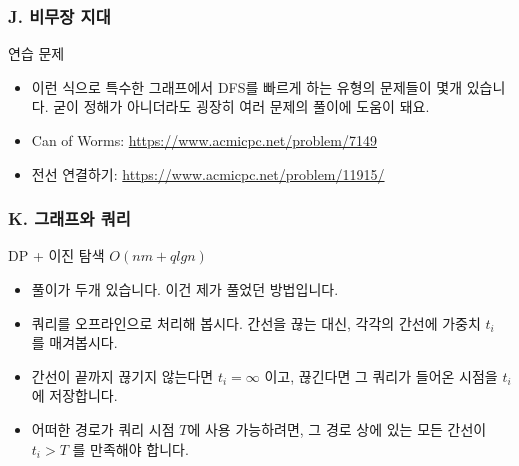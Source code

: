 \documentclass{beamer}
\begin{document}
\begin{frame}
	\frametitle{J. 비무장 지대}
	\begin{block}{연습 문제}
		\begin{itemize}
			\item 이런 식으로 특수한 그래프에서 DFS를 빠르게 하는 유형의 문제들이 몇개 있습니다. 굳이 정해가 아니더라도 굉장히 여러 문제의 풀이에 도움이 돼요.
			\item Can of Worms: \url{https://www.acmicpc.net/problem/7149}
			\item 전선 연결하기: \url{https://www.acmicpc.net/problem/11915/}
		\end{itemize}
	\end{block}
\end{frame}

\begin{frame}
	\frametitle{K. 그래프와 쿼리}
	\begin{block}{DP + 이진 탐색 $O(nm + qlgn)$}
		\begin{itemize}
			\item 풀이가 두개 있습니다. 이건 제가 풀었던 방법입니다. 
			\item 쿼리를 오프라인으로 처리해 봅시다. 간선을 끊는 대신, 각각의 간선에 가중치 $t_i$ 를 매겨봅시다. 
			\item 간선이 끝까지 끊기지 않는다면 $t_i = \infty$ 이고, 끊긴다면 그 쿼리가 들어온 시점을 $t_i$ 에 저장합니다.
			\item 어떠한 경로가 쿼리 시점 $T$에 사용 가능하려면, 그 경로 상에 있는 모든 간선이 $t_i > T$ 를 만족해야 합니다.
		\end{itemize}
	\end{block}
\end{frame}
\end{document}
